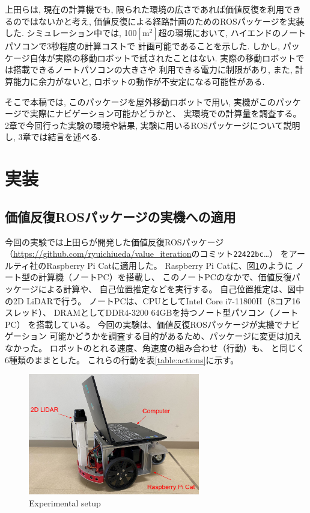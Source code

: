 \documentclass{jarticle}
\begin{document}
上田らは, 現在の計算機でも,
限られた環境の広さであれば価値反復を利用できるのではないかと考え,
価値反復による経路計画のためのROSパッケージを実装した\cite{上田rsj2021}.
シミュレーション中では, 100$\mathrm{[m^2]}$超の環境において,
ハイエンドのノートパソコンで3秒程度の計算コストで
計画可能であることを示した.
しかし, パッケージ自体が実際の移動ロボットで試されたことはない.
実際の移動ロボットでは搭載できるノートパソコンの大きさや
利用できる電力に制限があり,
また, 計算能力に余力がないと, ロボットの動作が不安定になる可能性がある.


そこで本稿では, このパッケージを屋外移動ロボットで用い,
実機がこのパッケージで実際にナビゲーション可能かどうかと、
実環境での計算量を調査する。
2章で今回行った実験の環境や結果, 実験に用いるROSパッケージについて説明し, 
3章では結言を述べる.

\section{実装}%

\subsection{価値反復ROSパッケージの実機への適用}

今回の実験では上田らが開発した価値反復ROSパッケージ
（\url{https://github.com/ryuichiueda/value_iteration}のコミット\texttt{22422bc}\dots）
\cite{上田rsj2021}をアールティ社のRaspberry Pi Catに適用した。
Raspberry Pi Catに、図\ref{fig:raspicat}のように
ノート型の計算機（ノートPC）を搭載し、
このノートPCのなかで、価値反復パッケージによる計算や、
自己位置推定などを実行する。
自己位置推定は、図中の2D LiDARで行う。
ノートPCは、CPUとしてIntel Core i7-11800H（8コア16スレッド）、
DRAMとしてDDR4-3200 64GBを持つノート型パソコン（ノートPC）
を搭載している。
今回の実験は、価値反復ROSパッケージが実機でナビゲーション
可能かどうかを調査する目的があるため、パッケージに変更は加えなかった。
ロボットのとれる速度、角速度の組み合わせ（行動）も、
\cite{上田rsj2021}と同じく6種類のままとした。
これらの行動を表\ref{table:actions}に示す。

\begin{figure}[htb]
  \centering
   \includegraphics[height=53mm]{./figs/raspicat.png}
   \caption{Experimental setup}
	\label{fig:raspicat}
\end{figure}
\end{document}
